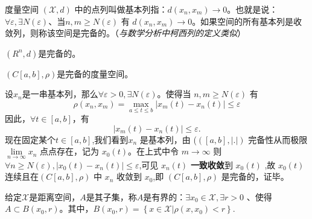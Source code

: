 \begin{definition}[基本列]
    度量空间 $(\mathscr{X},d)$ 中的点列叫做基本列指：$d(x_n,x_m)\to0$。也就是说：$\forall\varepsilon,\exists N(\varepsilon)$、当$n,m\ge N(\varepsilon)$ 有 $d(x_n,x_m)\to 0$。如果空间的所有基本列是收敛列，则称该空间是完备的。（\textit{与数学分析中柯西列的定义类似}）
\end{definition}
\begin{example}
    $(R^n, d)$是完备的。
\end{example}
\begin{example}
    $(C[a,b],\rho)$是完备的度量空间。
\end{example}
\begin{solution}
    设$x_{n}$是一串基本列，那么$\forall\varepsilon>0,\exists N(\varepsilon)$。使得当 $n,m\geq N(\varepsilon)$ 有 
    \begin{equation*}
        \rho\left(x_{n},x_{m}\right)=\max\limits_{a\leq t\leq b}\left|x_{m}\left(t\right)-x_{n}\left(t\right)\right|\leq\varepsilon
    \end{equation*}
    因此，$\forall t\in[a,b]$，有
    \begin{equation*}
        \left|x_{m}\left(t\right)-x_{n}\left(t\right)\right|\leq\varepsilon.
    \end{equation*}
    现在固定某个$t\in[a,b]$,我们看到$x_n$ 是基本列，由 ($([a,b],|.|)$ 完备性从而极限 $\lim\limits_{n\to\infty}x_n$ 点点存在，记为 $x_0(t)$。在上式中令 $m\to\infty$ 则$\forall n\geq N\left(\varepsilon\right),\left|x_{0}\left(t\right)-x_{n}\left(t\right)\right|\leq\varepsilon$,可见 $x_n(t)$ \textbf{一致收敛}到 $x_0(t)$ ,故 $x_0(t)$ 连续且在$\left(C[a,b],\rho\right)$ 中 $x_n$ 收敛到 $x_0$,即 $\left(C[a,b],\rho\right)$ 是完备的，证毕。
\end{solution}
\bigskip
\begin{definition}[有界]
    给定$\mathscr{X}$是距离空间，$A$是其子集，称$A$是有界的：$\exists x_0\in\mathscr{X},\exists r>0$ 、使得 $A\subset B\left(x_{0},r\right)$。其中，$B\left(x_{0},r\right)=\left\{x\in\mathscr{X}|\rho\left(x,x_{0}\right)<r\right\}.$
\end{definition} 

